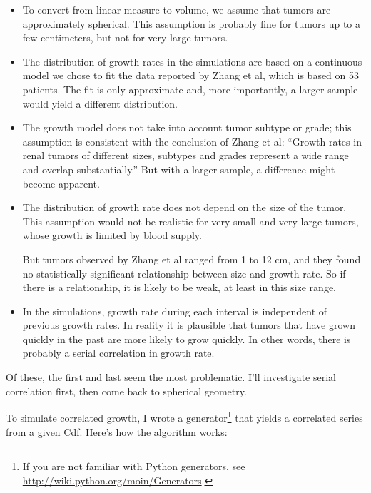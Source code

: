 \documentclass[12pt]{book}
\theoremstyle{exercise}
\begin{document}
\begin{itemize}

\item To convert from linear measure to volume, we assume that
  tumors are approximately spherical.  This assumption is probably
  fine for tumors up to a few centimeters, but not for very
  large tumors.

\item The distribution of growth rates in the simulations are based on
  a continuous model we chose to fit the data reported by Zhang et al,
  which is based on 53 patients.  The fit is only approximate and, more
  importantly, a larger sample would yield a
  different distribution.

\item The growth model does not take into account tumor subtype or
  grade; this assumption is consistent with the conclusion of Zhang et al:
  ``Growth rates in renal tumors of different sizes, subtypes and
  grades represent a wide range and overlap substantially.''
  But with a larger sample, a difference might become apparent.

\item The distribution of growth rate does not depend on the size of
  the tumor.  This assumption would not be realistic for very
  small and very large tumors, whose growth is limited by blood supply.

  But tumors observed by Zhang et al ranged from 1 to 12 cm, and they
  found no statistically significant relationship between
  size and growth rate.  So if there is a relationship, it is
  likely to be weak, at least in this size range.
  
\item In the simulations, growth rate during each interval is
  independent of previous growth rates.  In reality it is plausible
  that tumors that have grown quickly in the past are more likely
  to grow quickly.  In other words, there is probably
  a serial correlation in growth rate.

\end{itemize}

Of these, the first and last seem the most problematic.  I'll
investigate serial correlation first, then come back to
spherical geometry.

To simulate correlated growth, I wrote a generator\footnote{If you are
  not familiar with Python generators, see
  \url{http://wiki.python.org/moin/Generators}.} that yields a
correlated series from a given Cdf.  Here's how the algorithm works:
\end{document}

